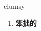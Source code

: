 
\begin{frame}
{\huge clumsy}
\begin{center}
\begin{enumerate}\Large
  \item \textbf{笨拙的}
\end{enumerate}
\end{center}
\end{frame}
